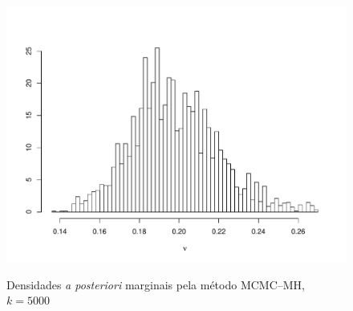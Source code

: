 \documentclass[9pt]{beamer}
\begin{document}
\begin{frame}
\begin{figure}[t]
{{		\includegraphics[scale=0.2]{figuras/nu_mh_5000.pdf}}}%
\caption{Densidades \textit{a posteriori} marginais pela método MCMC--MH, $k = 5000$}%
\end{figure}
\end{frame}
\end{document}
